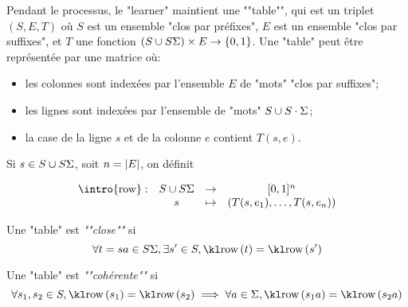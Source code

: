 Pendant le processus, le "learner" maintient une ""table"", qui est un triplet $(S,E,T)$ où $S$ est un ensemble "clos par préfixes",
$E$ est un ensemble "clos par suffixes", et $T$ une fonction $(S \cup S\Sigma) \times E \to \left\{0,1\right\}$. Une "table" peut être
représentée par une matrice où:
\begin{itemize}
	\item les colonnes sont indexées par l'ensemble $E$ de "mots" "clos par suffixes";
	\item les lignes sont indexées par l'ensemble de "mots" $S \cup S\cdot \Sigma$;
	\item la case de la ligne $s$ et de la colonne $e$ contient $T(s,e)$.
\end{itemize}


\begin{definition}
	Si $s \in S \cup S\Sigma$, soit $n = \left|E\right|$, on définit

	$$ \begin{array}{cccc}
			\text{\intro{row}}: & S\cup S\alphabet & \to     & [0,1]^n                        \\
			                    & s                & \mapsto & (T(s,e_1), \ldots, T(s, e_n))
		\end{array}$$


\end{definition}

\begin{definition}
	Une "table" est \emph{""close""} si
	$$ \forall t = sa \in S\alphabet, \exists s'\in S, \row t = \row {s'}$$
\end{definition}

\begin{definition}
	Une "table" est \emph{""cohérente""} si
	$$ \forall s_1, s_2 \in S, \row{s_1} = \row{s_2} \implies \forall a \in \alphabet, \row{s_1a} = \row{s_2a}$$
\end{definition}


